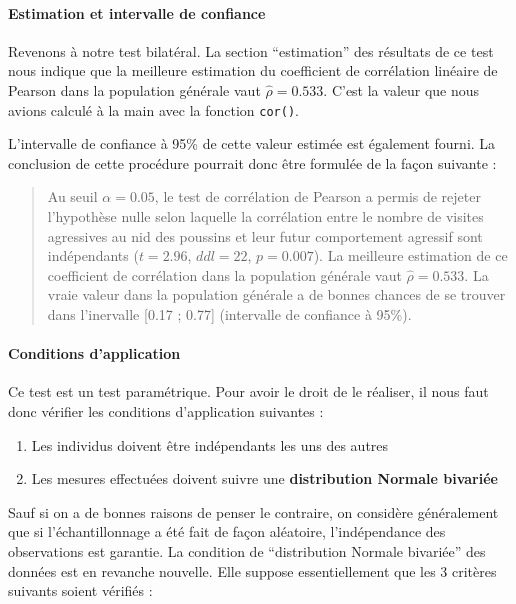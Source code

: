 \documentclass[a4paperpaper,]{article}
\providecommand{\tightlist}{%
  \setlength{\itemsep}{0pt}\setlength{\parskip}{0pt}}
\let\oldparagraph\paragraph
\renewcommand{\paragraph}[1]{\oldparagraph{#1}\mbox{}}
\begin{document}
\hypertarget{estimation-et-intervalle-de-confiance}{%
\paragraph{Estimation et intervalle de confiance}\label{estimation-et-intervalle-de-confiance}}

Revenons à notre test bilatéral. La section ``estimation'' des résultats de ce test nous indique que la meilleure estimation du coefficient de corrélation linéaire de Pearson dans la population générale vaut \(\hat{\rho} = 0.533\). C'est la valeur que nous avions calculé à la main avec la fonction \texttt{cor()}.

L'intervalle de confiance à 95\% de cette valeur estimée est également fourni. La conclusion de cette procédure pourrait donc être formulée de la façon suivante :

\begin{quote}
Au seuil \(\alpha = 0.05\), le test de corrélation de Pearson a permis de rejeter l'hypothèse nulle selon laquelle la corrélation entre le nombre de visites agressives au nid des poussins et leur futur comportement agressif sont indépendants (\(t = 2.96\), \(ddl = 22\), \(p = 0.007\)). La meilleure estimation de ce coefficient de corrélation dans la population générale vaut \(\hat{\rho} = 0.533\). La vraie valeur dans la population générale a de bonnes chances de se trouver dans l'inervalle {[}0.17 ; 0.77{]} (intervalle de confiance à 95\%).
\end{quote}

\hypertarget{conditions-dapplication-3}{%
\paragraph{Conditions d'application}\label{conditions-dapplication-3}}

Ce test est un test paramétrique. Pour avoir le droit de le réaliser, il nous faut donc vérifier les conditions d'application suivantes :

\begin{enumerate}
\def\labelenumi{\arabic{enumi}.}
\tightlist
\item
  Les individus doivent être indépendants les uns des autres
\item
  Les mesures effectuées doivent suivre une \textbf{distribution Normale bivariée}
\end{enumerate}

Sauf si on a de bonnes raisons de penser le contraire, on considère généralement que si l'échantillonnage a été fait de façon aléatoire, l'indépendance des observations est garantie. La condition de ``distribution Normale bivariée'' des données est en revanche nouvelle. Elle suppose essentiellement que les 3 critères suivants soient vérifiés :
\end{document}
